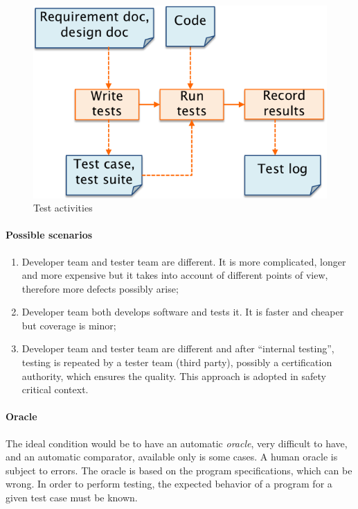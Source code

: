 \begin{figure}[hbtp]
\centering
\includegraphics[scale=0.35]{images/test_activities.png}
\caption{Test activities}
\end{figure}

\paragraph{Possible scenarios}
\begin{enumerate}
\item Developer team and tester team are different. It is more complicated, longer and more expensive but it takes into account of different points of view, therefore more defects possibly arise;
\item Developer team both develops software and tests it. It is faster and cheaper but coverage is minor;
\item Developer team and tester team are different and after ``internal testing'', testing is repeated by a tester team (third party), possibly a certification authority, which ensures the quality. This approach is adopted in safety critical context.
\end{enumerate}

\paragraph{Oracle}
The ideal condition would be to have an automatic \emph{oracle}, very difficult to have, and an automatic comparator, available only is some cases. A human oracle is subject to errors. The oracle is based on the program specifications, which can be wrong. In order to perform testing, the expected behavior of a program for a given test case must be known.

